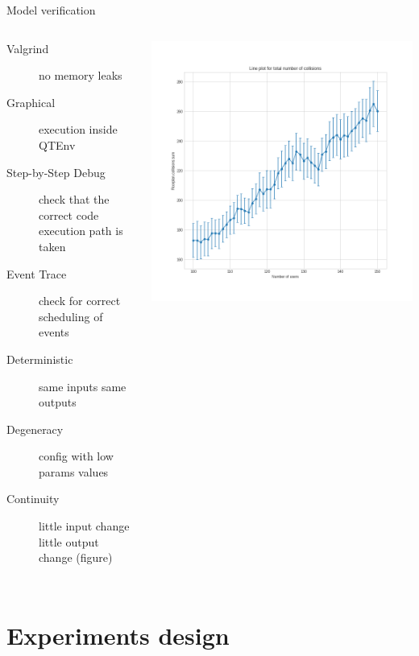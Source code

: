 \documentclass[aspectratio=169]{beamer}
\begin{document}
\begin{frame}{Model verification}
	\begin{columns}
		\begin{description}
			\item[Valgrind] no memory leaks
			\item[Graphical] execution inside QTEnv
			\item[Step-by-Step Debug] check that the correct code
				execution path is taken
			\item[Event Trace] check for correct scheduling of
				events
			\item[Deterministic] same inputs \textrightarrow{} same
				outputs
			\item[Degeneracy] config with low params values
			\item[Continuity] little input change \textrightarrow{}
				little output change (figure)
		\end{description}
		\includegraphics[width=\textwidth]{img/continuity-collisions}
	\end{columns}
\end{frame}

\section{Experiments design}
\end{document}
